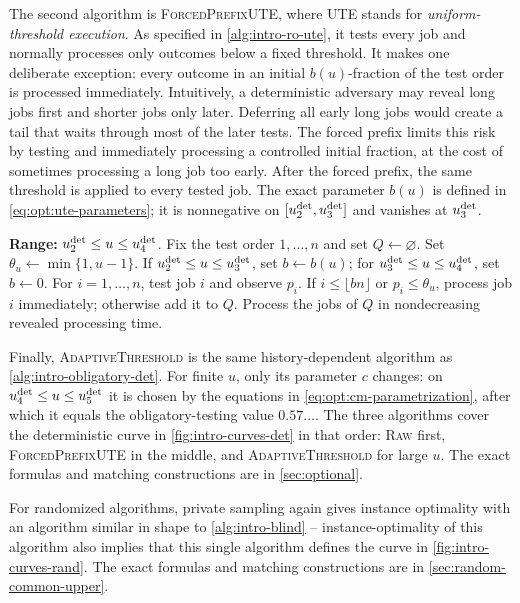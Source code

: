 The second algorithm is \textsc{ForcedPrefixUTE}, where UTE stands for
\emph{uniform-threshold execution}.  As specified in
\cref{alg:intro-ro-ute}, it tests every job and normally processes only
outcomes below a fixed threshold.  It makes one deliberate exception: every
outcome in an initial $b(u)$-fraction of the test order is processed
immediately.  Intuitively, a deterministic adversary may reveal long jobs
first and shorter jobs only later.  Deferring all early long jobs would
create a tail that waits through most of the later tests.  The forced prefix
limits this risk by testing and immediately processing a controlled initial
fraction, at the cost of sometimes processing a long job too early.  After
the forced prefix, the same threshold is applied to every tested job.
The exact parameter $b(u)$ is defined in
\cref{eq:opt:ute-parameters}; it is nonnegative on
$[u_{2}^{\mathrm{det}},u_{3}^{\mathrm{det}}]$ and vanishes at $u_{3}^{\mathrm{det}}$.

\begin{algorithm}[htbp]
\caption{}
\label{alg:intro-ro-ute}
\begin{algorithmic}
\Statex \textbf{Range:} $u_{2}^{\mathrm{det}}\le u\le u_{4}^{\mathrm{det}}$.
\State Fix the test order $1,\ldots,n$ and set $Q\gets\varnothing$.
\State Set $\theta_u\gets\min\{1,u-1\}$.  If
$u_{2}^{\mathrm{det}}\le u\le u_{3}^{\mathrm{det}}$, set $b\gets b(u)$; for
$u_{3}^{\mathrm{det}}\le u\le u_{4}^{\mathrm{det}}$, set $b\gets0$.
\State For $i=1,\ldots,n$, test job $i$ and observe $p_i$.
\State \quad If $i\le\lfloor bn\rfloor$ or $p_i\le\theta_u$, process
job $i$ immediately; otherwise add it to $Q$.
\State Process the jobs of $Q$ in nondecreasing revealed processing time.
\end{algorithmic}
\end{algorithm}

Finally, \textsc{AdaptiveThreshold} is the same history-dependent algorithm as
\cref{alg:intro-obligatory-det}.  For finite $u$, only its parameter $c$
changes: on $u_{4}^{\mathrm{det}}\le u\le u_{5}^{\mathrm{det}}$ it is chosen by the
equations in \cref{eq:opt:cm-parametrization}, after which it equals
the obligatory-testing value $0.57\ldots$.  The three algorithms cover
the deterministic curve in \cref{fig:intro-curves-det} in that order:
\textsc{Raw} first, \textsc{ForcedPrefixUTE} in the middle, and
\textsc{AdaptiveThreshold} for large $u$.  The exact formulas and matching
constructions are in \cref{sec:optional}.


For randomized algorithms, private sampling again gives instance optimality
with an algorithm similar in shape to \cref{alg:intro-blind} -- instance-optimality of this algorithm also implies that this single algorithm defines the curve in \cref{fig:intro-curves-rand}. The exact formulas and
matching constructions are in \cref{sec:random-common-upper}.


